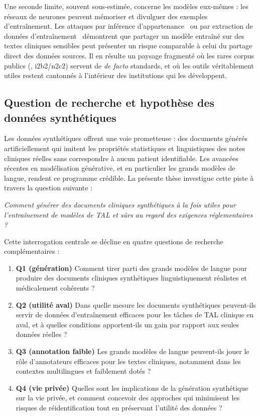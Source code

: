 Une seconde limite, souvent sous-estimée, concerne les modèles eux-mêmes : les réseaux
de neurones peuvent mémoriser et divulguer des exemples d'entraînement. Les attaques par
inférence d'appartenance~\citep{shokri2017membership} ou par extraction de données d'entraînement~\citep{carlini2021extracting} démontrent que
partager un modèle entraîné sur des textes cliniques sensibles peut présenter un risque
comparable à celui du partage direct des données sources. Il en résulte un paysage
fragmenté où les rares corpus publics (\mimic{}, i2b2/n2c2) servent de \emph{de facto}
standards, et où les outils véritablement utiles restent cantonnés à l'intérieur des
institutions qui les développent.

\subsection{Question de recherche et hypothèse des données synthétiques}

Les données synthétiques offrent une voie prometteuse : des documents générés
artificiellement qui imitent les propriétés statistiques et linguistiques des notes cliniques
réelles sans correspondre à aucun patient identifiable. Les avancées récentes en modélisation
générative, et en particulier les grands modèles de langue, rendent ce programme crédible.
La présente thèse investigue cette piste à travers la question suivante :
\begin{center}
\textit{Comment générer des documents cliniques synthétiques à la fois utiles pour
l'entraînement de modèles de TAL et sûrs au regard des exigences réglementaires ?}
\end{center}

Cette interrogation centrale se décline en quatre questions de recherche complémentaires :
\begin{enumerate}
  \item \textbf{Q1 (génération)} Comment tirer parti des grands modèles de langue pour
    produire des documents cliniques synthétiques linguistiquement réalistes et
    médicalement cohérents ?
  \item \textbf{Q2 (utilité aval)} Dans quelle mesure les documents synthétiques peuvent-ils
    servir de données d'entraînement efficaces pour les tâches de TAL clinique en aval, et
    à quelles conditions apportent-ils un gain par rapport aux seules données réelles ?
  \item \textbf{Q3 (annotation faible)} Les grands modèles de langue peuvent-ils jouer le
    rôle d'annotateurs efficaces pour les textes cliniques, notamment dans les contextes
    multilingues et faiblement dotés ?
  \item \textbf{Q4 (vie privée)} Quelles sont les implications de la génération synthétique
    sur la vie privée, et comment concevoir des approches qui minimisent les risques de
    réidentification tout en préservant l'utilité des données ?
\end{enumerate}

